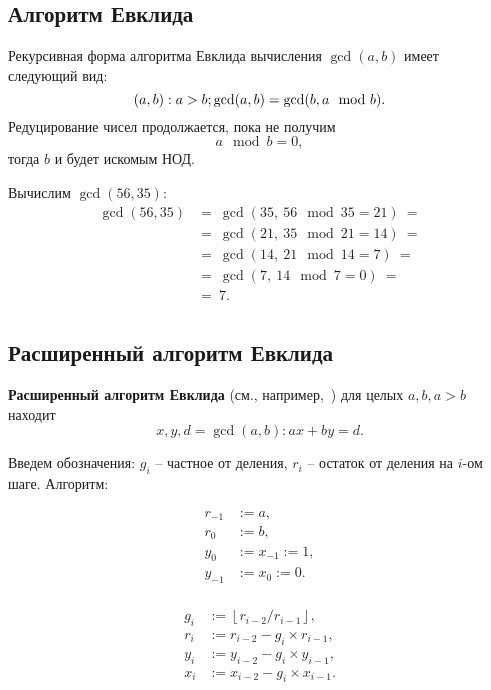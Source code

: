 \subsection{Алгоритм Евклида}

Рекурсивная форма алгоритма Евклида вычисления $\gcd(a,b)$ имеет следующий вид:
    \[\mathbb{(}a,b): a>b;  \gcd(a,b) = \gcd(b, a \mod b). \]
Редуцирование чисел продолжается, пока не получим
    \[ a \mod b = 0, \]
тогда $b$ и будет искомым НОД.

\example
Вычислим $\gcd(56, 35)$:
\[ \begin{array}{ll}
    \gcd(56, 35) & =~ \gcd(35, ~ 56 \mod 35 = 21) ~= \\
    & =~ \gcd(21, ~ 35 \mod 21 = 14) ~= \\
    & =~ \gcd(14, ~ 21 \mod 14 = 7) ~= \\
    & =~ \gcd(7, ~ 14 \mod 7 = 0) ~= \\
    & =~ 7. \\
\end{array} \]
\exampleend


\subsection{Расширенный алгоритм Евклида}

\textbf{Расширенный алгоритм Евклида} (см., например,~\cite[8.8 Наибольшие общие делители и алгоритм Евклида]{Aho:1979}) для целых $a, b, a > b$ находит
    \[ x, y, d = \gcd(a,b): ax + by = d. \]

Введем обозначения: $g_i$ -- частное от деления, $r_i$ -- остаток от деления на $i$-ом шаге. Алгоритм:

\[\begin{array}{ll}
	r_{-1} & := a, \\
	r_0 & := b, \\
	y_0 & := x_{-1} := 1, \\
	y_{-1} & := x_0 := 0. \\
\end{array}\]

\[\begin{array}{ll}
	g_i & := \left\lfloor r_{i-2} / r_{i-1} \right\rfloor, \\
	r_i & := r_{i-2} - g_i \times r_{i-1}, \\
	y_i & := y_{i-2} - g_i \times y_{i-1} , \\
	x_i & := x_{i-2} - g_i \times x_{i-1} . \\
\end{array}\]

